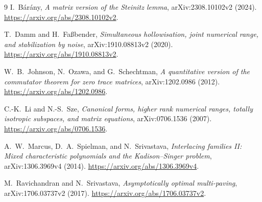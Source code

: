 \documentclass[11pt]{article}
\theoremstyle{remark}
\numberwithin{equation}{section}
\begin{document}
\begin{thebibliography}{9}
I.~B\'ar\'any,
\emph{A matrix version of the Steinitz lemma},
arXiv:2308.10102v2 (2024).
\url{https://arxiv.org/abs/2308.10102v2}.

T.~Damm and H.~Fa\ss bender,
\emph{Simultaneous hollowisation, joint numerical range, and stabilization by noise},
arXiv:1910.08813v2 (2020).
\url{https://arxiv.org/abs/1910.08813v2}.

W.~B.~Johnson, N.~Ozawa, and G.~Schechtman,
\emph{A quantitative version of the commutator theorem for zero trace matrices},
arXiv:1202.0986 (2012).
\url{https://arxiv.org/abs/1202.0986}.

C.-K.~Li and N.-S.~Sze,
\emph{Canonical forms, higher rank numerical ranges, totally isotropic subspaces,
and matrix equations},
arXiv:0706.1536 (2007).
\url{https://arxiv.org/abs/0706.1536}.

A.~W.~Marcus, D.~A.~Spielman, and N.~Srivastava,
\emph{Interlacing families II: Mixed characteristic polynomials and the
Kadison--Singer problem},
arXiv:1306.3969v4 (2014).
\url{https://arxiv.org/abs/1306.3969v4}.

M.~Ravichandran and N.~Srivastava,
\emph{Asymptotically optimal multi-paving},
arXiv:1706.03737v2 (2017).
\url{https://arxiv.org/abs/1706.03737v2}.
\end{thebibliography}
\end{document}
